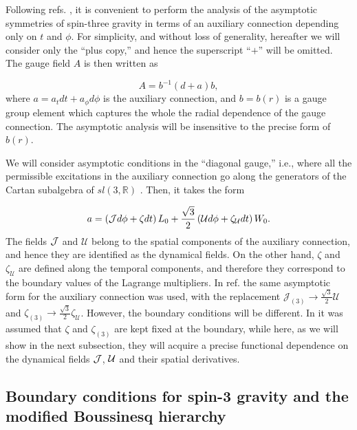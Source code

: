 \documentclass[letterpaper,11pt,oneside]{book}
\begin{document}
Following refs. \cite{Coussaert:1995zp,Henneaux:2010xg,Campoleoni:2010zq},
it is convenient to perform the analysis of the asymptotic symmetries
of spin-three gravity in terms of an auxiliary connection depending
only on $t$ and $\phi$. For simplicity, and without loss of generality,
hereafter we will consider only the ``plus copy,'' and hence the
superscript ``$+$'' will be omitted. The gauge field $A$ is then
written as

\begin{equation}
	A=b^{-1}\left(d+a\right)b,\label{eq:A Connections}
\end{equation}
where $a=a_{t}dt+a_{\phi}d\phi$ is the auxiliary connection, and
$b=b\left(r\right)$ is a gauge group element which captures the whole
the radial dependence of the gauge connection. The asymptotic analysis
will be insensitive to the precise form of $b\left(r\right)$.

We will consider asymptotic conditions in the ``diagonal gauge,''
i.e., where all the permissible excitations in the auxiliary connection
go along the generators of the Cartan subalgebra of $sl\left(3,\mathbb{R}\right)$
\cite{Grumiller:2016kcp}. Then, it takes the form

\begin{equation}
	a=\left({\cal J}d\phi+\zeta dt\right)L_{0}+\frac{\sqrt{3}}{2}\left(\mathcal{U}d\phi+\zeta_{\mathcal{U}}dt\right)W_{0}.\label{eq:Auxiliary Connections}
\end{equation}
The fields \emph{${\cal J}$} and\emph{ $\mathcal{U}$} belong to
the spatial components of the auxiliary connection, and hence they
are identified as the dynamical fields. On the other hand, \emph{$\zeta$
}and\emph{ $\zeta_{\mathcal{U}}$} are defined along the temporal
components, and therefore they correspond to the boundary values of
the Lagrange multipliers. In ref. \cite{Grumiller:2016kcp} the same
asymptotic form for the auxiliary connection was used, with the replacement
$\mathcal{J}_{\left(3\right)}\rightarrow\frac{\sqrt{3}}{2}\mathcal{U}$
and $\zeta_{\left(3\right)}\rightarrow\frac{\sqrt{3}}{2}\zeta_{\mathcal{U}}$.
However, the boundary conditions will be different. In \cite{Grumiller:2016kcp}
it was assumed that $\zeta$ and $\zeta_{\left(3\right)}$ are kept
fixed at the boundary, while here, as we will show in the next subsection,
they will acquire a precise functional dependence on the dynamical
fields ${\cal J}$, ${\cal U}$ and their spatial derivatives.

\subsection{Boundary conditions for spin-3 gravity and the modified Boussinesq
	hierarchy\label{subsec:2.2 Consistency-with-the}}
\end{document}

